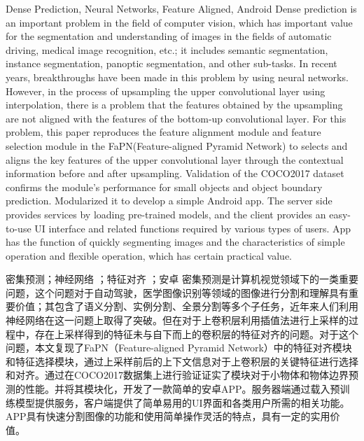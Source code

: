 \begin{英文摘要}{Dense Prediction, Neural Networks, Feature Aligned, Android}
  Dense prediction is an important problem in the field of computer vision, which has important value for the segmentation and understanding of images in the fields of automatic driving, medical image recognition, etc.; it includes semantic segmentation, instance segmentation, panoptic segmentation, and other sub-tasks. In recent years, breakthroughs have been made in this problem by using neural networks. However, in the process of upsampling the upper convolutional layer using interpolation, there is a problem that the features obtained by the upsampling are not aligned with the features of the bottom-up convolutional layer. For this problem, this paper reproduces the feature alignment module and feature selection module in the FaPN(Feature-aligned Pyramid Network) to selects and aligns the key features of the upper convolutional layer through the contextual information before and after upsampling. Validation of the COCO2017 dataset confirms the module's performance for small objects and object boundary prediction. Modularized it to develop a simple Android app. The server side provides services by loading pre-trained models, and the client provides an easy-to-use UI interface and related functions required by various types of users. App has the function of quickly segmenting images and the characteristics of simple operation and flexible operation, which has certain practical value.
\end{英文摘要}

\begin{中文摘要}{密集预测；神经网络 ；特征对齐 ；安卓}
  密集预测是计算机视觉领域下的一类重要问题，这个问题对于自动驾驶，医学图像识别等领域的图像进行分割和理解具有重要价值；其包含了语义分割、实例分割、全景分割等多个子任务，近年来人们利用神经网络在这一问题上取得了突破。但在对于上卷积层利用插值法进行上采样的过程中，存在上采样得到的特征未与自下而上的卷积层的特征对齐的问题。对于这个问题，本文复现了FaPN（Feature-aligned Pyramid Network）中的特征对齐模块和特征选择模块，通过上采样前后的上下文信息对于上卷积层的关键特征进行选择和对齐。通过在COCO2017数据集上进行验证证实了模块对于小物体和物体边界预测的性能。并将其模块化，开发了一款简单的安卓APP。服务器端通过载入预训练模型提供服务，客户端提供了简单易用的UI界面和各类用户所需的相关功能。APP具有快速分割图像的功能和使用简单操作灵活的特点，具有一定的实用价值。
\end{中文摘要}


